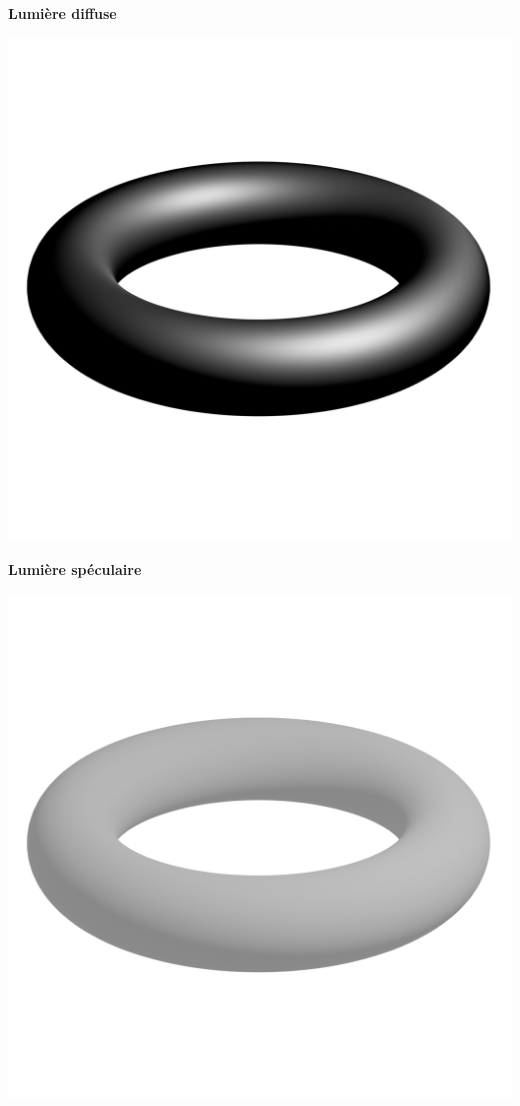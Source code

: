 \documentclass[11pt,class=report,crop=false]{standalone}
\begin{document}
\begin{center}
\begin{minipage}{0.32\textwidth}
	{\bf \qquad Lumière diffuse}
    \end{minipage}
	\begin{minipage}{0.32\textwidth}
	\center
	\includegraphics[scale=\myscale,scale=0.15, trim={0 6cm 0 4cm}, clip]{figures/tore-speculaire}
	
	{\bf \qquad Lumière spéculaire}
    \end{minipage}

	\begin{minipage}{0.49\textwidth}
	\center
	\includegraphics[scale=\myscale,scale=0.20, trim={0 6cm 0 4cm}, clip]{figures/tore-ambiante-diffuse}
	

\end{minipage}
\end{center}
\end{document}
